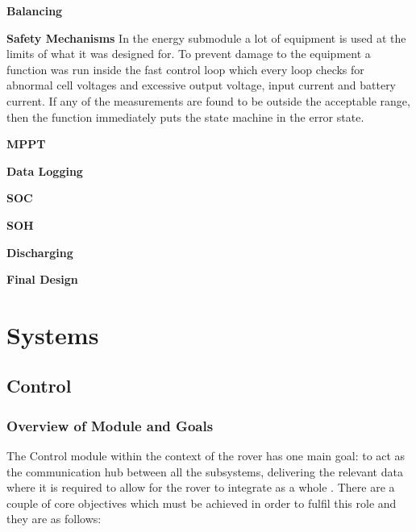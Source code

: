 \documentclass[a4paper]{article}
\begin{document}
\textbf{Balancing}
\vspace{10pt} 
\newline

\textbf{Safety Mechanisms}
\vspace{10pt} 
\newline
In the energy submodule a lot of equipment is used at the limits of what it was designed for.
To prevent damage to the equipment a function was run inside the fast control loop
which every loop checks for abnormal cell voltages and excessive output voltage, input
current and battery current. If any of the measurements are found to be outside the
acceptable range, then the function immediately puts the state machine in the error
state.

\textbf{MPPT}
\vspace{10pt} 
\newline

\textbf{Data Logging}
\vspace{10pt} 
\newline

\textbf{SOC}
\vspace{10pt} 
\newline

\textbf{SOH}
\vspace{10pt} 
\newline

\textbf{Discharging}
\vspace{10pt} 
\newline

\textbf{Final Design}
\vspace{10pt} 
\newline











\section{Systems}

\subsection{Control}
 
\subsubsection{Overview of Module and Goals}
The Control module within the context of the rover has one main goal: 
to act as the communication hub between all the subsystems, delivering
the relevant data where it is required to allow for the rover to integrate
as a whole \cite{MarsRoverSpec}. There are a couple of core objectives which must be 
achieved in order to fulfil this role and they are as follows:
\end{document}
